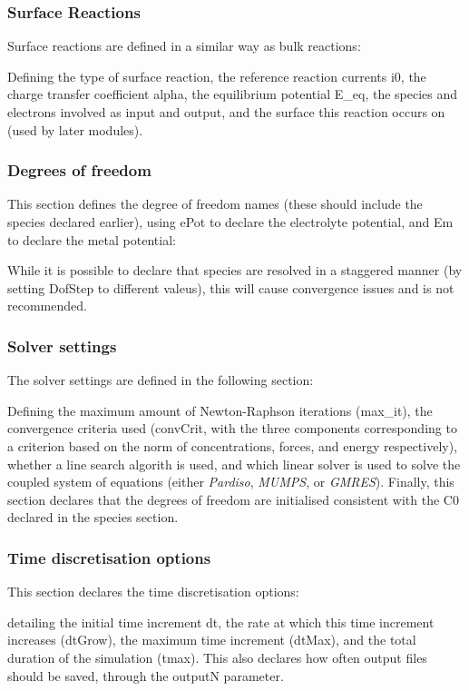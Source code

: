 \documentclass[3p]{elsarticle} %
\newcommand{\CodeSnipU}[4]{}
\begin{document}
\subsubsection{Surface Reactions}
Surface reactions are defined in a similar way as bulk reactions:
\CodeSnipU{TestCases/ElectroChemistry/Test_ElectroChem.json}{97}{112}{TestCases/ElectroChemistry/Test\_ElectroChem.json}
Defining the type of surface reaction, the reference reaction currents i0, the charge transfer coefficient alpha, the equilibrium potential E\_eq, the species and electrons involved as input and output, and the surface this reaction occurs on (used by later modules).

\subsubsection{Degrees of freedom}
This section defines the degree of freedom names (these should include the species declared earlier), using ePot to declare the electrolyte potential, and Em to declare the metal potential:
\CodeSnipU{TestCases/ElectroChemistry/Test_ElectroChem.json}{146}{149}{TestCases/ElectroChemistry/Test\_ElectroChem.json}
While it is possible to declare that species are resolved in a staggered manner (by setting DofStep to different valeus), this will cause convergence issues and is not recommended. 

\subsubsection{Solver settings}
The solver settings are defined in the following section:
\CodeSnipU{TestCases/ElectroChemistry/Test_ElectroChem.json}{150}{166}{TestCases/ElectroChemistry/Test\_ElectroChem.json}
Defining the maximum amount of Newton-Raphson iterations (max\_it), the convergence criteria used (convCrit, with the three components corresponding to a criterion based on the norm of concentrations, forces, and energy respectively), whether a line search algorith is used, and which linear solver is used to solve the coupled system of equations (either \textit{Pardiso}, \textit{MUMPS}, or \textit{GMRES}). Finally, this section declares that the degrees of freedom are initialised consistent with the C0 declared in the species section.

\subsubsection{Time discretisation options}
This section declares the time discretisation options:
\CodeSnipU{TestCases/ElectroChemistry/Test_ElectroChem.json}{167}{173}{TestCases/ElectroChemistry/Test\_ElectroChem.json}
detailing the initial time increment dt, the rate at which this time increment increases (dtGrow), the maximum time increment (dtMax), and the total duration of the simulation (tmax). This also declares how often output files should be saved, through the outputN parameter. 
\end{document}
